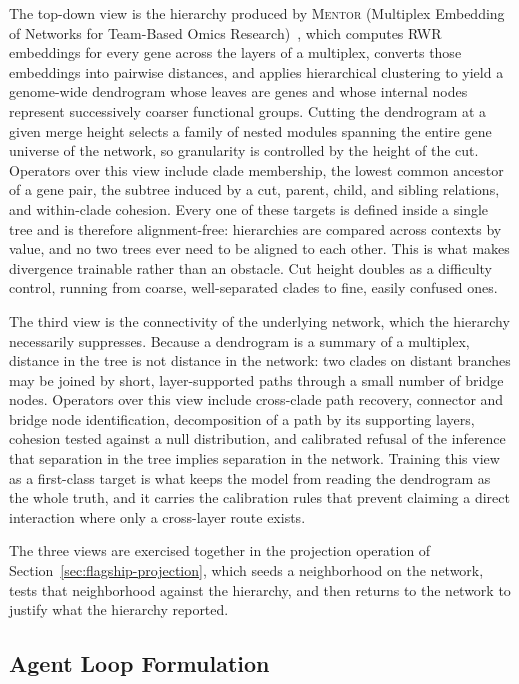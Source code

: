 \documentclass[thesis,letterpaper,12pt]{utthesis}
\begin{document}
The top-down view is the hierarchy produced by \textsc{Mentor} (Multiplex Embedding of Networks for Team-Based Omics Research)~\cite{mentor}, which computes RWR embeddings for every gene across the layers of a multiplex, converts those embeddings into pairwise distances, and applies hierarchical clustering to yield a genome-wide dendrogram whose leaves are genes and whose internal nodes represent successively coarser functional groups. Cutting the dendrogram at a given merge height selects a family of nested modules spanning the entire gene universe of the network, so granularity is controlled by the height of the cut. Operators over this view include clade membership, the lowest common ancestor of a gene pair, the subtree induced by a cut, parent, child, and sibling relations, and within-clade cohesion. Every one of these targets is defined inside a single tree and is therefore alignment-free: hierarchies are compared across contexts by value, and no two trees ever need to be aligned to each other. This is what makes divergence trainable rather than an obstacle. Cut height doubles as a difficulty control, running from coarse, well-separated clades to fine, easily confused ones.

The third view is the connectivity of the underlying network, which the hierarchy necessarily suppresses. Because a dendrogram is a summary of a multiplex, distance in the tree is not distance in the network: two clades on distant branches may be joined by short, layer-supported paths through a small number of bridge nodes. Operators over this view include cross-clade path recovery, connector and bridge node identification, decomposition of a path by its supporting layers, cohesion tested against a null distribution, and calibrated refusal of the inference that separation in the tree implies separation in the network. Training this view as a first-class target is what keeps the model from reading the dendrogram as the whole truth, and it carries the calibration rules that prevent claiming a direct interaction where only a cross-layer route exists.

The three views are exercised together in the projection operation of Section~\ref{sec:flagship-projection}, which seeds a neighborhood on the network, tests that neighborhood against the hierarchy, and then returns to the network to justify what the hierarchy reported.

\subsection{Agent Loop Formulation}\label{sec:agent_loop}
\end{document}
